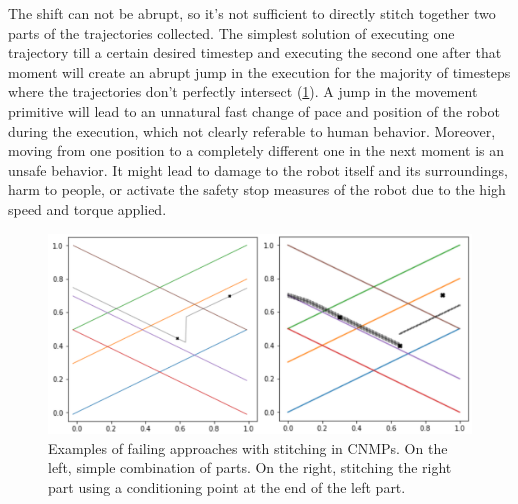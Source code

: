 The shift can not be abrupt, so it's not sufficient to directly stitch together two parts of the trajectories collected. 
The simplest solution of executing one trajectory till a certain desired timestep and executing the second one after that moment will create an abrupt jump in the execution for the majority of timesteps where the trajectories don't perfectly intersect (\cref{fig:trajX-failing-approaches}). A jump in the movement primitive will lead to an unnatural fast change of pace and position of the robot during the execution, which not clearly referable to human behavior. Moreover, moving from one position to a completely different one in the next moment is an unsafe behavior. It might lead to damage to the robot itself and its surroundings, harm to people, or activate the safety stop measures of the robot due to the high speed and torque applied.  

\begin{figure}
    \centering
    \includegraphics[width=0.8\linewidth]{figures/trajX-failing-approaches.png}
    \caption{Examples of failing approaches with stitching in CNMPs. On the left, simple combination of parts. On the right, stitching the right part using a conditioning point at the end of the left part.}
    \label{fig:trajX-failing-approaches}
\end{figure}

